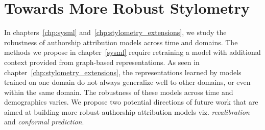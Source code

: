 \section{Towards More Robust Stylometry}

In chapters~\ref{chp:sysml} and~\ref{chp:stylometry_extensions}, we study the robustness of authorship attribution models across time and domains.
The methods we propose in chapter~\ref*{sysml} require retraining a model with additional context provided from graph-based representations.
As seen in chapter~\ref*{chp:stylometry_extensions}, the representations learned by models trained on one domain do not always generalize well to other domains, or even within the same domain.
The robustness of these models across time and demographics varies.
We propose two potential directions of future work that are aimed at building more robust authorship attribution models viz. \emph{recalibration} and \emph{conformal prediction}.

